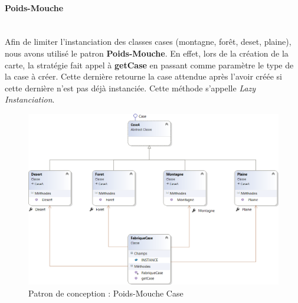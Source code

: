 \documentclass[a4paper,11pt]{article}
\begin{document}
\paragraph{Poids-Mouche}\mbox{}\medskip\\
Afin de limiter l'instanciation des classes cases (montagne, forêt, deset, plaine), nous avons utilisé le patron \textbf{Poids-Mouche}. En effet, lors de la création de la carte, la stratégie fait appel à \textbf{getCase} en passant comme paramètre le type de la case à créer. Cette dernière retourne la case attendue après l'avoir créée si cette dernière n'est pas déjà instanciée. Cette méthode s'appelle \textit{Lazy Instanciation}.
\begin{figure}[H]
	\centering
	\includegraphics[width=\textwidth]{fig/poidsmouche_case}
	\caption{Patron de conception : Poids-Mouche Case}
	\label{pc:pmc}
\end{figure}
\end{document}
